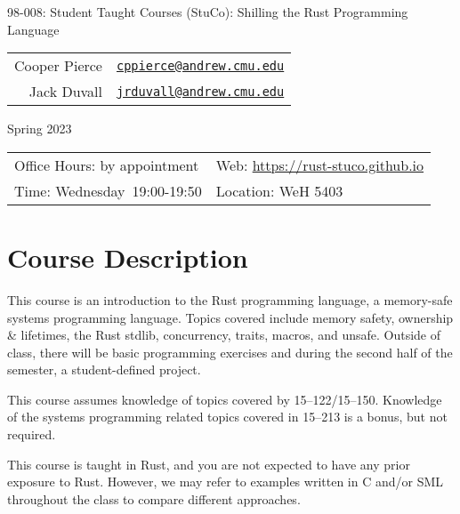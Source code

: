 \documentclass{article}
\newcommand{\longcoursename}{
    Student Taught Courses (StuCo): Shilling the Rust Programming Language
}
\newcommand{\courselocation}{WeH 5403}
\newcommand{\meetingstarttime}{19:00}
\newcommand{\meetingendtime}{19:50}
\newcommand{\meetingdays}{Wednesday}
\newcommand{\longsemester}{Spring 2023}
\newcommand{\deptcode}{98}
\newcommand{\coursecode}{008}
\newcommand{\fullcoursecode}{\deptcode-\coursecode}
\begin{document}
\thispagestyle{empty}
\begin{center}
\begin{minipage}{.85\textwidth}
    \centering
    {\huge {\fullcoursecode: \longcoursename}}

    \vspace{1em}

    \begin{tabular}{@{}rl@{}}
        Cooper Pierce & \href{mailto:cppierce@andrew.cmu.edu}{\texttt{cppierce@andrew.cmu.edu}} \\ 
        Jack Duvall & \href{mailto:jrduvall@andrew.cmu.edu}{\texttt{jrduvall@andrew.cmu.edu}} \\
    \end{tabular}

    \vspace{1em}

    \longsemester
\end{minipage}
\end{center}

\vspace{3em}


\begin{tabular*}{.93\textwidth}{@{\extracolsep{\fill}}ll}
    \toprule
    Office Hours: by appointment & Web: \url{https://rust-stuco.github.io} \\
    Time: \meetingdays\ \meetingstarttime-\meetingendtime & Location: \courselocation \\
    \bottomrule
\end{tabular*}

\vspace{5em}

\section*{Course Description}

This course is an introduction to the Rust programming language, a memory-safe
systems programming language. Topics covered include memory safety, ownership \&
lifetimes, the Rust stdlib, concurrency, traits, macros, and unsafe. Outside of
class, there will be basic programming exercises and during the second half of
the semester, a student-defined project.

This course assumes knowledge of topics covered by 15--122/15--150. Knowledge of
the systems programming related topics covered in 15--213 is a bonus, but not
required.

This course is taught in Rust, and you are not expected to have any prior
exposure to Rust. However, we may refer to examples written in C and/or SML
throughout the class to compare different approaches.
\end{document}
